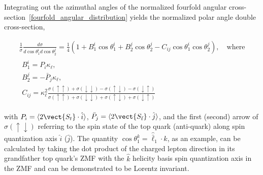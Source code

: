 \begin{refsection}
Integrating out the azimuthal angles of the normalized fourfold angular cross-section~\ref{fourfold_angular_distribution} yields the normalized polar angle double cross-section,
\begin{linenomath*}
\begin{gather}
\label{double_angular_distribution}
\frac{1}{\sigma} \frac{d \sigma}{d \cos \theta_1^i d \cos \theta_2^j}=\frac{1}{4}\left(1+B_1^{i} \cos \theta_1^i+B_2^{j} \cos \theta_2^j-C_{ij} \cos \theta_1^i \cos \theta_2^j\right), \quad \text{where} \\
\label{Polarizations_and_Spin_Correlations}
\begin{array}{c}
B_1^{i} = P_{i}\kappa_\ell,\\
B_2^{j} = -\bar{P}_{j}\kappa_\ell,\\
C_{ij}=\kappa_{\ell}^2 \frac{\sigma(\uparrow \uparrow)+\sigma(\downarrow \downarrow)-\sigma(\uparrow \downarrow)-\sigma(\downarrow \uparrow)}{\sigma(\uparrow \uparrow)+\sigma(\downarrow \downarrow)+\sigma(\uparrow \downarrow)+\sigma(\downarrow \uparrow)}
\end{array}
\end{gather}
\end{linenomath*}
with $P_{i} = \langle 2 \vect{S_t} \cdot \hat{i} \rangle$, $\bar{P}_{j} = \langle 2 \vect{S_{\bar{t}}} \cdot \hat{j} \rangle$, and the first (second) arrow of $\sigma(\uparrow \downarrow)$ referring to the spin state of the top quark (anti-quark) along spin quantization axis $\hat{i}$ ($\hat{j}$).
The quantity $\cos \theta_1^k = \hat{\bar{\ell}}_1 \cdot \hat{k}$, as an example, can be calculated by taking the dot product of the charged lepton direction in its grandfather top quark's ZMF with the $\hat{k}$ helicity basis spin quantization axis in the \ttbar ZMF and can be demonstrated to be Lorentz invariant.


\end{refsection}
